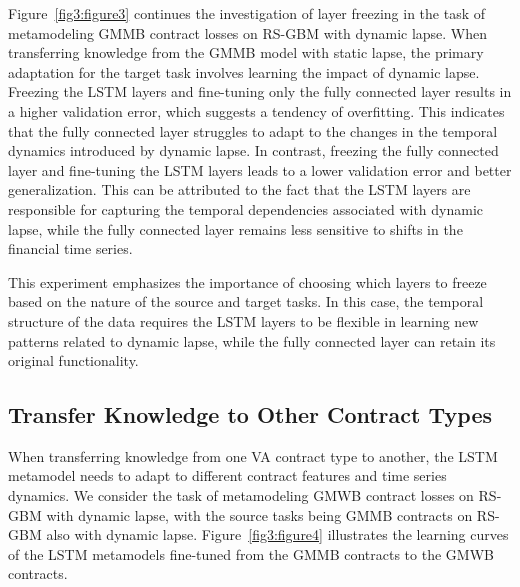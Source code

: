 Figure~\ref{fig3:figure3} continues the investigation of layer freezing in the task of metamodeling GMMB contract losses on RS-GBM with dynamic lapse. 
When transferring knowledge from the GMMB model with static lapse, the primary adaptation for the target task involves learning the impact of dynamic lapse.
Freezing the LSTM layers and fine-tuning only the fully connected layer results in a higher validation error, which suggests a tendency of overfitting.
This indicates that the fully connected layer struggles to adapt to the changes in the temporal dynamics introduced by dynamic lapse.
In contrast, freezing the fully connected layer and fine-tuning the LSTM layers leads to a lower validation error and better generalization. 
This can be attributed to the fact that the LSTM layers are responsible for capturing the temporal dependencies associated with dynamic lapse, while the fully connected layer remains less sensitive to shifts in the financial time series.

This experiment emphasizes the importance of choosing which layers to freeze based on the nature of the source and target tasks. 
In this case, the temporal structure of the data requires the LSTM layers to be flexible in learning new patterns related to dynamic lapse, while the fully connected layer can retain its original functionality.

\subsection{Transfer Knowledge to Other Contract Types}

When transferring knowledge from one VA contract type to another, the LSTM metamodel needs to adapt to different contract features and time series dynamics.
We consider the task of metamodeling GMWB contract losses on RS-GBM with dynamic lapse, with the source tasks being GMMB contracts on RS-GBM also with dynamic lapse.
Figure~\ref{fig3:figure4} illustrates the learning curves of the LSTM metamodels fine-tuned from the GMMB contracts to the GMWB contracts.

